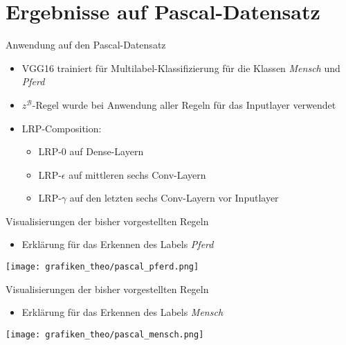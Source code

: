 \section{Ergebnisse auf Pascal-Datensatz}
\frame{\sectionpage}
\begin{frame}{Anwendung auf den Pascal-Datensatz}
\begin{itemize}
\item VGG16 trainiert für Multilabel-Klassifizierung für die Klassen \textit{Mensch} und \textit{Pferd}
\item $z^{\mathcal{B}}$-Regel wurde bei Anwendung aller Regeln für das Inputlayer verwendet
\item LRP-Composition:
\begin{itemize}
\item LRP-0 auf Dense-Layern
\item LRP-$\epsilon$ auf mittleren sechs Conv-Layern
\item LRP-$\gamma$ auf den letzten sechs Conv-Layern vor Inputlayer
\end{itemize}
\end{itemize}
\end{frame}

\begin{frame}{Visualisierungen der bisher vorgestellten Regeln}
\begin{itemize}
\item Erklärung für das Erkennen des Labels \textit{Pferd}
\end{itemize}
\texttt{[image: grafiken\_theo/pascal\_pferd.png]}
\end{frame}

\begin{frame}{Visualisierungen der bisher vorgestellten Regeln}
\begin{itemize}
\item Erklärung für das Erkennen des Labels \textit{Mensch}
\end{itemize}
\texttt{[image: grafiken\_theo/pascal\_mensch.png]}
\end{frame}

